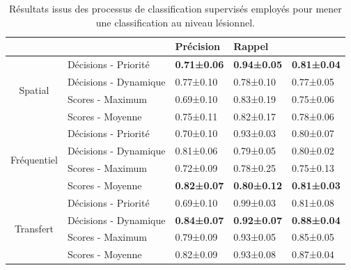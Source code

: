 \begin{table}[H]
    \centering
    \begin{tabular}{cllll}
        \toprule
        \multicolumn{1}{l}{}         &                      & Précision          & Rappel             & \fscore{}            \\ \midrule
        \multirow{4}{*}{Spatial}     & Décisions - Priorité & \textbf{0.71±0.06} & \textbf{0.94±0.05} & \textbf{0.81±0.04} \\
                                     & Décisions - Dynamique& 0.77±0.10          & 0.78±0.10          & 0.77±0.05          \\
                                     & Scores - Maximum     & 0.69±0.10          & 0.83±0.19          & 0.75±0.06          \\
                                     & Scores - Moyenne     & 0.75±0.11          & 0.82±0.17          & 0.78±0.06          \\ \midrule
        \multirow{4}{*}{Fréquentiel} & Décisions - Priorité & 0.70±0.10          & 0.93±0.03          & 0.80±0.07          \\
                                     & Décisions - Dynamique& 0.81±0.06          & 0.79±0.05          & 0.80±0.02          \\
                                     & Scores - Maximum     & 0.72±0.09          & 0.78±0.25          & 0.75±0.13          \\
                                     & Scores - Moyenne     & \textbf{0.82±0.07} & \textbf{0.80±0.12} & \textbf{0.81±0.03} \\ \midrule
        \multirow{4}{*}{Transfert}   & Décisions - Priorité & 0.69±0.10          & 0.99±0.03          & 0.81±0.08          \\
                                     & Décisions - Dynamique& \textbf{0.84±0.07} & \textbf{0.92±0.07} & \textbf{0.88±0.04} \\
                                     & Scores - Maximum     & 0.79±0.09          & 0.93±0.05          & 0.85±0.05          \\
                                     & Scores - Moyenne     & 0.82±0.09          & 0.93±0.08          & 0.87±0.04          \\ \bottomrule
    \end{tabular}
    \caption{Résultats issus des processus de classification supervisés employés pour mener une classification au niveau lésionnel.}
    \label{tab:results_lesion_classification_supervised_patient}
\end{table}\par

